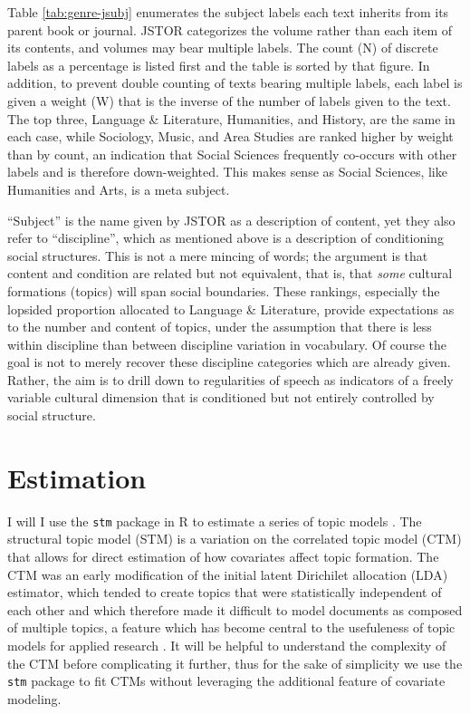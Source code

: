 \documentclass[]{book}
\theoremstyle{definition}
\theoremstyle{definition}
\theoremstyle{definition}
\theoremstyle{remark}
\begin{document}
Table \ref{tab:genre-jsubj} enumerates the subject labels each text
inherits from its parent book or journal. JSTOR categorizes the volume
rather than each item of its contents, and volumes may bear multiple
labels. The count (N) of discrete labels as a percentage is listed first
and the table is sorted by that figure. In addition, to prevent double
counting of texts bearing multiple labels, each label is given a weight
(W) that is the inverse of the number of labels given to the text. The
top three, Language \& Literature, Humanities, and History, are the same
in each case, while Sociology, Music, and Area Studies are ranked higher
by weight than by count, an indication that Social Sciences frequently
co-occurs with other labels and is therefore down-weighted. This makes
sense as Social Sciences, like Humanities and Arts, is a meta subject.

``Subject'' is the name given by JSTOR as a description of content, yet
they also refer to ``discipline'', which as mentioned above is a
description of conditioning social structures. This is not a mere
mincing of words; the argument is that content and condition are related
but not equivalent, that is, that \emph{some} cultural formations
(topics) will span social boundaries. These rankings, especially the
lopsided proportion allocated to Language \& Literature, provide
expectations as to the number and content of topics, under the
assumption that there is less within discipline than between discipline
variation in vocabulary. Of course the goal is not to merely recover
these discipline categories which are already given. Rather, the aim is
to drill down to regularities of speech as indicators of a freely
variable cultural dimension that is conditioned but not entirely
controlled by social structure.

\hypertarget{estimation}{%
\section{Estimation}\label{estimation}}

I will I use the \texttt{stm} package in R to estimate a series of topic
models \citep{Roberts2013structural, Roberts2018stm}. The structural
topic model (STM) is a variation on the correlated topic model (CTM)
that allows for direct estimation of how covariates affect topic
formation. The CTM was an early modification of the initial latent
Dirichilet allocation (LDA) estimator, which tended to create topics
that were statistically independent of each other and which therefore
made it difficult to model documents as composed of multiple topics, a
feature which has become central to the usefuleness of topic models for
applied research \citep{Blei2007correlated}. It will be helpful to
understand the complexity of the CTM before complicating it further,
thus for the sake of simplicity we use the \texttt{stm} package to fit
CTMs without leveraging the additional feature of covariate modeling.
\end{document}
